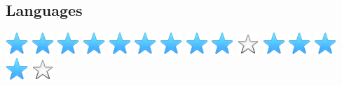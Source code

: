 \documentclass[]{cv-class}
\begin{document}
\begin{aside}
 \section{Languages}
    {\includegraphics[scale=0.25]{img/star.png}
    \includegraphics[scale=0.25]{img/star.png}
    \includegraphics[scale=0.25]{img/star.png}
    \includegraphics[scale=0.25]{img/star.png}
    \includegraphics[scale=0.25]{img/star.png}}
    {\includegraphics[scale=0.25]{img/star.png}
    \includegraphics[scale=0.25]{img/star.png}
    \includegraphics[scale=0.25]{img/star.png}
    \includegraphics[scale=0.25]{img/star.png}
    \includegraphics[scale=0.25]{img/star_empty.png}}
    {\includegraphics[scale=0.25]{img/star.png}
 \includegraphics[scale=0.25]{img/star.png}
\includegraphics[scale=0.25]{img/star.png}
\includegraphics[scale=0.25]{img/star.png}
\includegraphics[scale=0.25]{img/star_empty.png}}
\end{aside}
\end{document}
